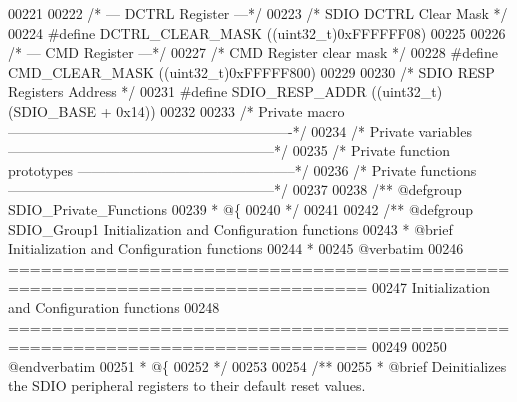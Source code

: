 \begin{DoxyCode}
00221 
00222 \textcolor{comment}{/* --- DCTRL Register ---*/}
00223 \textcolor{comment}{/* SDIO DCTRL Clear Mask */}
00224 \textcolor{preprocessor}{#}\textcolor{preprocessor}{define} \textcolor{preprocessor}{DCTRL\_CLEAR\_MASK}         \textcolor{preprocessor}{(}\textcolor{preprocessor}{(}\textcolor{preprocessor}{uint32\_t}\textcolor{preprocessor}{)}0xFFFFFF08\textcolor{preprocessor}{)}
00225 
00226 \textcolor{comment}{/* --- CMD Register ---*/}
00227 \textcolor{comment}{/* CMD Register clear mask */}
00228 \textcolor{preprocessor}{#}\textcolor{preprocessor}{define} \textcolor{preprocessor}{CMD\_CLEAR\_MASK}           \textcolor{preprocessor}{(}\textcolor{preprocessor}{(}\textcolor{preprocessor}{uint32\_t}\textcolor{preprocessor}{)}0xFFFFF800\textcolor{preprocessor}{)}
00229 
00230 \textcolor{comment}{/* SDIO RESP Registers Address */}
00231 \textcolor{preprocessor}{#}\textcolor{preprocessor}{define} \textcolor{preprocessor}{SDIO\_RESP\_ADDR}           \textcolor{preprocessor}{(}\textcolor{preprocessor}{(}\textcolor{preprocessor}{uint32\_t}\textcolor{preprocessor}{)}\textcolor{preprocessor}{(}SDIO_BASE \textcolor{preprocessor}{+} 0x14\textcolor{preprocessor}{)}\textcolor{preprocessor}{)}
00232 
00233 \textcolor{comment}{/* Private macro -------------------------------------------------------------*/}
00234 \textcolor{comment}{/* Private variables ---------------------------------------------------------*/}
00235 \textcolor{comment}{/* Private function prototypes -----------------------------------------------*/}
00236 \textcolor{comment}{/* Private functions ---------------------------------------------------------*/}
00237 
00238 \textcolor{comment}{/** @defgroup SDIO\_Private\_Functions}
00239 \textcolor{comment}{  * @\{}
00240 \textcolor{comment}{  */}
00241 
00242 \textcolor{comment}{/** @defgroup SDIO\_Group1 Initialization and Configuration functions}
00243 \textcolor{comment}{ *  @brief   Initialization and Configuration functions }
00244 \textcolor{comment}{ *}
00245 \textcolor{comment}{@verbatim   }
00246 \textcolor{comment}{ ===============================================================================}
00247 \textcolor{comment}{                 Initialization and Configuration functions}
00248 \textcolor{comment}{ ===============================================================================}
00249 \textcolor{comment}{}
00250 \textcolor{comment}{@endverbatim}
00251 \textcolor{comment}{  * @\{}
00252 \textcolor{comment}{  */}
00253 
00254 \textcolor{comment}{/**}
00255 \textcolor{comment}{  * @brief  Deinitializes the SDIO peripheral registers to their default reset values.}

\end{DoxyCode}
